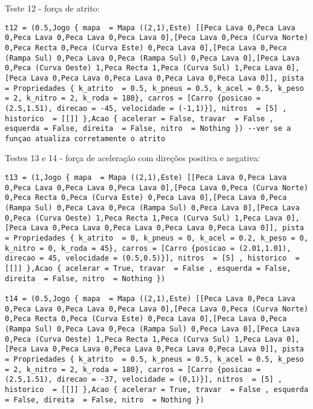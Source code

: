 \documentclass[a4paper]{report}
\begin{document}
Teste 12 - força de atrito:

\begin{lstlisting}
t12 = (0.5,Jogo { mapa  = Mapa ((2,1),Este) [[Peca Lava 0,Peca Lava 0,Peca Lava 0,Peca Lava 0,Peca Lava 0],[Peca Lava 0,Peca (Curva Norte) 0,Peca Recta 0,Peca (Curva Este) 0,Peca Lava 0],[Peca Lava 0,Peca (Rampa Sul) 0,Peca Lava 0,Peca (Rampa Sul) 0,Peca Lava 0],[Peca Lava 0,Peca (Curva Oeste) 1,Peca Recta 1,Peca (Curva Sul) 1,Peca Lava 0],[Peca Lava 0,Peca Lava 0,Peca Lava 0,Peca Lava 0,Peca Lava 0]], pista = Propriedades { k_atrito  = 0.5, k_pneus = 0.5, k_acel = 0.5, k_peso = 2, k_nitro = 2, k_roda = 180}, carros = [Carro {posicao = (2.5,1.51), direcao = -45, velocidade = (-1,1)}], nitros  = [5] , historico  = [[]] },Acao { acelerar = False, travar  = False , esquerda = False, direita  = False, nitro  = Nothing }) --ver se a funçao atualiza corretamente o atrito
\end{lstlisting}

Testes 13 e 14 - força de aceleração com direções positiva e negativa:

\begin{lstlisting}
t13 = (1,Jogo { mapa  = Mapa ((2,1),Este) [[Peca Lava 0,Peca Lava 0,Peca Lava 0,Peca Lava 0,Peca Lava 0],[Peca Lava 0,Peca (Curva Norte) 0,Peca Recta 0,Peca (Curva Este) 0,Peca Lava 0],[Peca Lava 0,Peca (Rampa Sul) 0,Peca Lava 0,Peca (Rampa Sul) 0,Peca Lava 0],[Peca Lava 0,Peca (Curva Oeste) 1,Peca Recta 1,Peca (Curva Sul) 1,Peca Lava 0],[Peca Lava 0,Peca Lava 0,Peca Lava 0,Peca Lava 0,Peca Lava 0]], pista = Propriedades { k_atrito  = 0, k_pneus = 0, k_acel = 0.2, k_peso = 0, k_nitro = 0, k_roda = 45}, carros = [Carro {posicao = (2.01,1.01), direcao = 45, velocidade = (0.5,0.5)}], nitros  = [5] , historico  = [[]] },Acao { acelerar = True, travar  = False , esquerda = False, direita  = False, nitro  = Nothing })

t14 = (0.5,Jogo { mapa  = Mapa ((2,1),Este) [[Peca Lava 0,Peca Lava 0,Peca Lava 0,Peca Lava 0,Peca Lava 0],[Peca Lava 0,Peca (Curva Norte) 0,Peca Recta 0,Peca (Curva Este) 0,Peca Lava 0],[Peca Lava 0,Peca (Rampa Sul) 0,Peca Lava 0,Peca (Rampa Sul) 0,Peca Lava 0],[Peca Lava 0,Peca (Curva Oeste) 1,Peca Recta 1,Peca (Curva Sul) 1,Peca Lava 0],[Peca Lava 0,Peca Lava 0,Peca Lava 0,Peca Lava 0,Peca Lava 0]], pista = Propriedades { k_atrito  = 0.5, k_pneus = 0.5, k_acel = 0.5, k_peso = 2, k_nitro = 2, k_roda = 180}, carros = [Carro {posicao = (2.5,1.51), direcao = -37, velocidade = (0,1)}], nitros  = [5] , historico  = [[]] },Acao { acelerar = True, travar  = False , esquerda = False, direita  = False, nitro  = Nothing })
\end{lstlisting}
\end{document}
